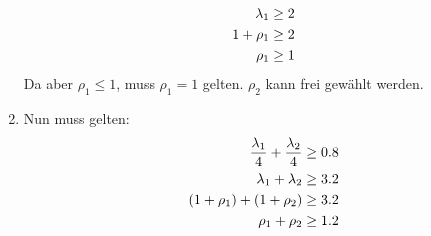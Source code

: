 \documentclass{article}
\begin{document}
\begin{enumerate}[label=(\alph*)]
\begin{align}
			\lambda_1 &\ge 2 \notag \\
			1+\rho_1 &\ge 2 \notag \\
			\rho_1 &\ge 1 \notag
		\end{align}
		Da aber $\rho_1 \le 1$, muss $\rho_1=1$ gelten. $\rho_2$ kann frei gewählt werden.
		\item Nun muss gelten:
		\begin{align}
			\frac{\lambda_1}{4} + \frac{\lambda_2}{4} &\ge 0.8 \notag \\
			\lambda_1 + \lambda_2 &\ge 3.2 \notag \\
			(1+\rho_1) + (1+\rho_2) &\ge 3.2 \notag \\
			\rho_1 + \rho_2 &\ge 1.2 \notag
		\end{align}
	\end{enumerate}
	
\end{document}
